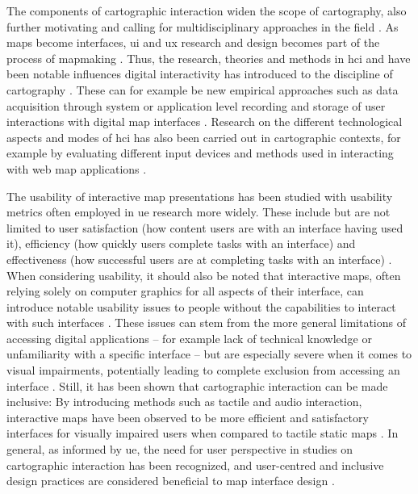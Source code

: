 The components of cartographic interaction widen the scope of cartography,
also further motivating and calling for
multidisciplinary approaches in the field \parencite{rot2013b}.
As maps become interfaces,
\acrshort{ui} and \acrshort{ux} research and design becomes
part of the process of mapmaking \parencite{rot2015}.
Thus, the research, theories and methods in \acrshort{hci}
and  have been notable influences
digital interactivity has introduced to the discipline of cartography \parencite{rot2017}.
These can for example be new empirical approaches such as
data acquisition through system or application level recording and storage of
user interactions with digital map interfaces \parencite{oom2015}.
Research on the different technological aspects and modes of \acrshort{hci}
has also been carried out in cartographic contexts,
for example by evaluating different input devices and methods
used in interacting with web map applications \parencite{wu2011}.

The usability of interactive map presentations has been studied with
usability metrics often employed in \acrshort{ue} research more widely.
These include but are not limited to
user satisfaction (how content users are with an interface having used it),
efficiency (how quickly users complete tasks with an interface)
and effectiveness (how successful users are at completing tasks with an interface)
\parencite{col2009}.
When considering usability, it should also be noted that interactive maps,
often relying solely on computer graphics for all aspects of their interface,
can introduce notable usability issues
to people without the capabilities to interact with such interfaces \parencite{duc2018}.
These issues can stem from the more general limitations of accessing digital applications --
for example lack of technical knowledge or unfamiliarity with a specific interface \parencite{kul2019} --
but are especially severe when it comes to visual impairments,
potentially leading to complete exclusion from accessing an interface \parencite{duc2018}.
Still, it has been shown that cartographic interaction can be made inclusive:
By introducing methods such as tactile and audio interaction,
interactive maps have been observed to be more efficient and satisfactory interfaces
for visually impaired users when compared to tactile static maps \parencite{bro2015}.
In general, as informed by \acrshort{ue},
the need for user perspective in studies on cartographic interaction has been recognized,
and user-centred and inclusive design practices are considered beneficial to map interface design
\parencite{niv2007, rot2017, duc2018}.

